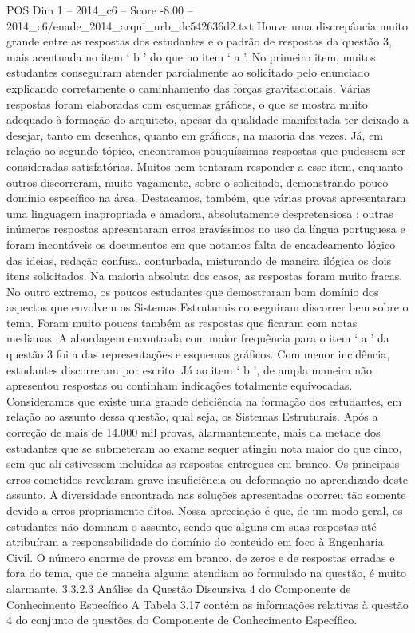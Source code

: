 \begin{textsample}{POS Dim 1 – 2014\_c6 – Score -8.00 – 2014\_c6/enade\_2014\_arqui\_urb\_dc542636d2.txt}
Houve uma discrepância muito grande entre as respostas dos estudantes e o padrão de respostas da questão 3, mais acentuada no item ‘ b ’ do que no item ‘ a ’.
No primeiro item, muitos estudantes conseguiram atender parcialmente ao solicitado pelo enunciado explicando corretamente o caminhamento das forças gravitacionais.
Várias respostas foram elaboradas com esquemas gráficos, o que se mostra muito adequado à formação do arquiteto, apesar da qualidade manifestada ter deixado a desejar, tanto em desenhos, quanto em gráficos, na maioria das vezes.
Já, em relação ao segundo tópico, encontramos pouquíssimas respostas que pudessem ser consideradas satisfatórias.
Muitos nem tentaram responder a esse item, enquanto outros discorreram, muito vagamente, sobre o solicitado, demonstrando pouco domínio específico na área.
Destacamos, também, que várias provas apresentaram uma linguagem inapropriada e amadora, absolutamente despretensiosa ; outras inúmeras respostas apresentaram erros gravíssimos no uso da língua portuguesa e foram incontáveis os documentos em que notamos falta de encadeamento lógico das ideias, redação confusa, conturbada, misturando de maneira ilógica os dois itens solicitados.
Na maioria absoluta dos casos, as respostas foram muito fracas.
No outro extremo, os poucos estudantes que demostraram bom domínio dos aspectos que envolvem os Sistemas Estruturais conseguiram discorrer bem sobre o tema.
Foram muito poucas também as respostas que ficaram com notas medianas.
A abordagem encontrada com maior frequência para o item ‘ a ’ da questão 3 foi a das representações e esquemas gráficos.
Com menor incidência, estudantes discorreram por escrito.
Já ao item ‘ b ’, de ampla maneira não apresentou respostas ou continham indicações totalmente equivocadas.
Consideramos que existe uma grande deficiência na formação dos estudantes, em relação ao assunto dessa questão, qual seja, os Sistemas Estruturais.
Após a correção de mais de 14.000 mil provas, alarmantemente, mais da metade dos estudantes que se submeteram ao exame sequer atingiu nota maior do que cinco, sem que ali estivessem incluídas as respostas entregues em branco.
Os principais erros cometidos revelaram grave insuficiência ou deformação no aprendizado deste assunto.
A diversidade encontrada nas soluções apresentadas ocorreu tão somente devido a erros propriamente ditos.
Nossa apreciação é que, de um modo geral, os estudantes não dominam o assunto, sendo que alguns em suas respostas até atribuíram a responsabilidade do domínio do conteúdo em foco à Engenharia Civil.
O número enorme de provas em branco, de zeros e de respostas erradas e fora do tema, que de maneira alguma atendiam ao formulado na questão, é muito alarmante. 3.3.2.3 Análise da Questão Discursiva 4 do Componente de Conhecimento Específico A Tabela 3.17 contém as informações relativas à questão 4 do conjunto de questões do Componente de Conhecimento Específico.

\end{textsample}
